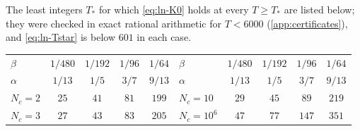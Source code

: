 \documentclass[11pt,a4paper]{amsart}
\theoremstyle{definition}
\theoremstyle{remark}
\numberwithin{equation}{section}
\begin{document}
The least integers $T_*$ for which \eqref{eq:ln-K0} holds at every $T\ge T_*$ are listed below; they were checked in exact rational arithmetic for $T<6000$ (\cref{app:certificates}), and \eqref{eq:ln-Tstar} is below $601$ in each case.
\begin{center}\small
\begin{tabular}{@{}lcccc@{\qquad}lcccc@{}}
\toprule
$\beta$ & $1/480$ & $1/192$ & $1/96$ & $1/64$ & $\beta$ & $1/480$ & $1/192$ & $1/96$ & $1/64$\\
$\alpha$ & $1/13$ & $1/5$ & $3/7$ & $9/13$ & $\alpha$ & $1/13$ & $1/5$ & $3/7$ & $9/13$\\
\midrule
$N_c=2$ & $25$ & $41$ & $81$ & $199$ & $N_c=10$ & $29$ & $45$ & $89$ & $219$\\
$N_c=3$ & $27$ & $43$ & $83$ & $205$ & $N_c=10^6$ & $47$ & $77$ & $147$ & $351$\\
\bottomrule
\end{tabular}
\end{center}
\end{document}
